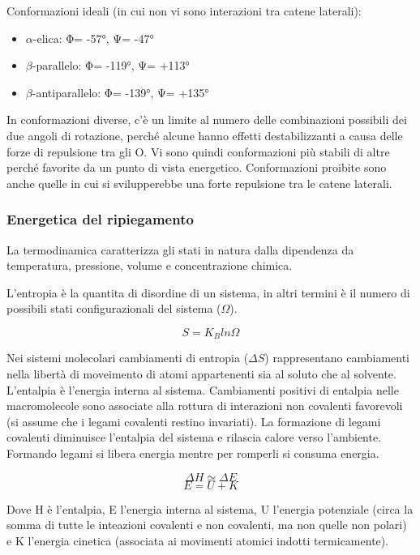 {{{\par Conformazioni ideali (in cui non vi sono interazioni tra catene laterali):
\begin{itemize}
	\item $\alpha$-elica: Φ= -57°, Ψ= -47°
	\item $\beta$-parallelo: Φ= -119°, Ψ= +113°
	\item $\beta$-antiparallelo: Φ= -139°, Ψ= +135°
\end{itemize}

\par In conformazioni diverse, c’è un limite al numero delle combinazioni
possibili dei due angoli di rotazione, perché alcune hanno effetti
destabilizzanti a causa delle forze di repulsione tra gli O. Vi sono quindi conformazioni più stabili di altre perché favorite da un
punto di vista energetico. Conformazioni proibite sono anche quelle in cui si svilupperebbe una forte repulsione tra le catene laterali.
}

\subsubsection{Energetica del ripiegamento}
La termodinamica caratterizza gli stati in natura dalla dipendenza da temperatura, pressione, volume e concentrazione chimica. 

\par L'entropia è la quantita di disordine di un sistema, in altri termini è il numero di possibili stati configurazionali del sistema ($\Omega$). 

\[ S = K_{B}ln{\Omega} \]

Nei sistemi molecolari cambiamenti di entropia ($\Delta S$) rappresentano cambiamenti nella libertà di moveimento di atomi appartenenti sia al soluto che al solvente.  L'entalpia è l'energia interna al sistema. Cambiamenti positivi di entalpia nelle macromolecole sono associate alla rottura di interazioni non covalenti favorevoli (si assume che i legami covalenti restino invariati). La formazione di legami covalenti diminuisce l'entalpia del sistema e rilascia calore verso l'ambiente. Formando legami si libera energia mentre per romperli si consuma energia.

\[ \Delta H \simeq \Delta E \] 
\[ E = U + K \]

Dove H è l'entalpia, E l'energia interna al sistema, U l'energia potenziale (circa la somma di tutte le inteazioni covalenti e non covalenti, ma non quelle non polari) e K l'energia cinetica (associata ai movimenti atomici indotti termicamente).\\

}}
